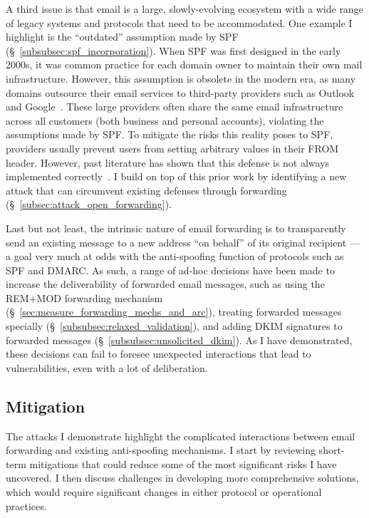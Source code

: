 A third issue is that email is a large, slowly-evolving ecosystem with a wide range of legacy systems and protocols that need to be accommodated.
One example I highlight is the ``outdated'' assumption made by SPF (\S~\ref{subsubsec:spf_incorporation}). When SPF was first designed in the early 2000s, it was common practice for each domain owner to maintain their own mail infrastructure. However, this assumption is obsolete in the modern era, as many domains outsource their email services to third-party providers such as Outlook and Google~\cite{liu2021s}. These large providers often share the same email infrastructure across all customers (both business and personal accounts), violating the assumptions made by SPF. 
To mitigate the risks this reality poses to SPF, providers 
usually prevent users from setting arbitrary values in their FROM header. However, past literature has shown that this defense is not always implemented correctly~\cite{chen2020composition}. I build on top of this prior work by identifying a new attack that can circumvent existing defenses through forwarding (\S~\ref{subsec:attack_open_forwarding}).

Last but not least, the intrinsic nature of email forwarding is to transparently send an existing message to a new address ``on behalf'' of its original recipient --- a goal very much at odds with the anti-spoofing function of protocols such as SPF and DMARC. As such, a range of ad-hoc decisions have been made to increase the deliverability of forwarded email messages, such as using the REM+MOD forwarding mechanism (\S~\ref{sec:measure_forwarding_mechs_and_arc}), treating forwarded messages specially (\S~\ref{subsubsec:relaxed_validation}), and adding DKIM signatures to forwarded messages (\S~\ref{subsubsec:unsolicited_dkim}). As I have demonstrated, 
these decisions can fail to foresee unexpected interactions that lead to vulnerabilities, even with a lot of deliberation.

\subsection{Mitigation}
The attacks I demonstrate highlight the complicated interactions
between email forwarding and existing anti-spoofing mechanisms. I start by reviewing short-term mitigations that could reduce some of the most significant risks I have uncovered. I then discuss challenges in developing more comprehensive solutions, which would require significant changes in either
protocol or operational practices.

